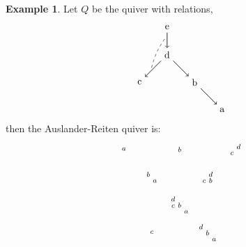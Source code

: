 \documentclass[11.5pt, twoside, a4paper, titlepage]{report}
\theoremstyle{definition}
\newtheorem{eg}[mydef]{Example}
\theoremstyle{plain}
\begin{document}
\begin{eg}
Let $Q$ be the quiver with relations, 
\begin{equation*}
\begin{tikzpicture}[->,-latex, auto, m path/.style={->, semithick}, every node/.style={}]
\node				(1) at (0,0)		{a};
\node 				(2) at (-1,1)		{b};
\node 				(3) at (-3,1)		{c};
\node 				(4) at (-2,2)		{d};
\node 				(5) at (-2,3)		{e};
\node				(6) at (-2.6,1.4)	{};
\node				(7) at (-2, 2.7)	{};

\draw (2) [m path] edge (1);
\draw (4) [m path] edge (2);
\draw (4) [m path] edge (3);
\draw (5) [m path] edge (4);
\draw (6) [-, dashed] edge [bend left=10] (7);
\end{tikzpicture}
\end{equation*}
then the Auslander-Reiten quiver is:
\begin{equation*}
\begin{tikzpicture}[->,-latex, auto, main path/.style={->, semithick}, t path/.style={->, dashed, semithick}, every node/.style={}]
\node			(a) at (0,0)		{$\begin{smallmatrix}a\end{smallmatrix}$};
\node 			(ba) at (1,-1)	{$\begin{smallmatrix}b& \\ &a\end{smallmatrix}$};
\node 			(c) at (1,-3)		{$\begin{smallmatrix} c \end{smallmatrix}$};
\node			(b) at (2,0)		{$\begin{smallmatrix}b\end{smallmatrix}$};
\node 			(dcba) at (2, -2)	{$\begin{smallmatrix}d & & \\ c & b & \\ & & a\end{smallmatrix}$};
\node 			(dcb) at (3,-1)	{$\begin{smallmatrix}&d \\ c & b\end{smallmatrix}$};
\node 			(dba) at (3,-3)	{$\begin{smallmatrix}d& & \\ &b & \\ & & a \end{smallmatrix}$};
\node 			(dc) at (4,0)		{$\begin{smallmatrix}&d \\ c& \end{smallmatrix}$};

\end{tikzpicture}
\end{equation*}
\end{eg}
\end{document}
